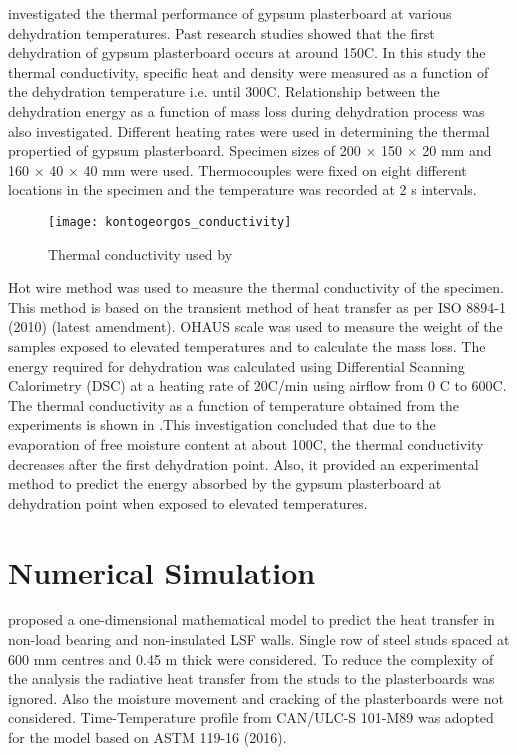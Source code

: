 \citet{Kontogeorgos2011} investigated the thermal performance of gypsum plasterboard at various dehydration temperatures. Past research studies showed that the first dehydration of gypsum plasterboard occurs at around 150\degree C. In this study the thermal conductivity, specific heat and density were measured as a function of the dehydration temperature i.e. until 300\degree C. Relationship between the dehydration energy as a function of mass loss during dehydration process was also investigated. Different heating rates were used in determining the thermal propertied of gypsum plasterboard. Specimen sizes of 200 $\times$ 150 $\times$ 20 mm and 160 $\times$ 40 $\times$ 40 mm were used. Thermocouples were fixed on eight different locations in the specimen and the temperature was recorded at 2 s intervals. 
\begin{figure}[htbp]
	\centering
		\texttt{[image: kontogeorgos\_conductivity]}		
		\caption{Thermal conductivity used by \citet{Kontogeorgos2011}}
		\label{fig:kontogeorgos_conductivity}
\end{figure}

Hot wire method was used to measure the thermal conductivity of the specimen. This method is based on the transient method of heat transfer as per ISO 8894-1 (2010) (latest amendment). OHAUS scale was used to measure the weight of the samples exposed to elevated temperatures and to calculate the mass loss. The energy required for dehydration was calculated using Differential Scanning Calorimetry (DSC) at a heating rate of 20\degree C/min using airflow from 0 \degree C to 600\degree C. The thermal conductivity as a function of temperature obtained from the experiments is shown in .This investigation concluded that due to the evaporation of free moisture content at about 100\degree C, the thermal conductivity decreases after the first dehydration point. Also, it provided an experimental method to predict the energy absorbed by the gypsum plasterboard at dehydration point when exposed to elevated temperatures.

\section{Numerical Simulation}

\citet{Sultan1996} proposed a one-dimensional mathematical model to predict the heat transfer in non-load bearing and non-insulated LSF walls. Single row of steel studs spaced at 600 mm centres and 0.45 m thick were considered. To reduce the complexity of the analysis the radiative heat transfer from the studs to the plasterboards was ignored. Also the moisture movement and cracking of the plasterboards were not considered. Time-Temperature profile from CAN/ULC-S 101-M89 was adopted for the model based on ASTM 119-16 (2016).

